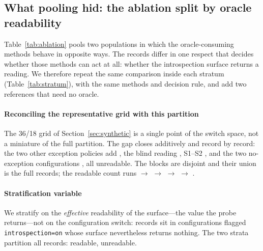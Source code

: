 
\subsection{What pooling hid: the ablation split by oracle readability}
\label{sec:stratum}

Table~\ref{tab:ablation} pools two populations in which the oracle-consuming methods behave in
opposite ways. The records differ in one respect that decides whether those methods can act at
all: whether the introspection surface returns a reading. We therefore repeat the same comparison
inside each stratum (Table~\ref{tab:stratum}), with the same methods and decision rule, and add two
references that need no oracle.

\paragraph{Reconciling the representative grid with this partition}
The 36/18 grid of Section~\ref{sec:synthetic} is a single point of the switch space, not a
miniature of the full partition. The gap closes additively and record by record: the two other
exception policies add \DsgStepPvN{}, the blind reading \DsgStepGuiN{}, S1--S2 \DsgStepSXN{}, and
the two no-exception configurations \DsgStepNoeThreeN{}, all unreadable. The blocks are disjoint
and their union is the full \DsgRecords{} records; the readable count runs \DsgGridOn{}
$\rightarrow$ \DsgBaseTwoOn{} $\rightarrow$ \DsgAllSwOn{} $\rightarrow$ \DsgEthreeOn{}
$\rightarrow$ \DsgFullOn{}.

\paragraph{Stratification variable} We stratify on the \emph{effective} readability of the
surface---the value the probe returns---not on the configuration switch:
\MiiFlagOnButUnavailable{} records sit in configurations flagged \texttt{introspection=on} whose
surface nevertheless returns nothing. The two strata partition all \MiiNTotal{} records:
\MiiNOn{} readable, \MiiNOff{} unreadable.

